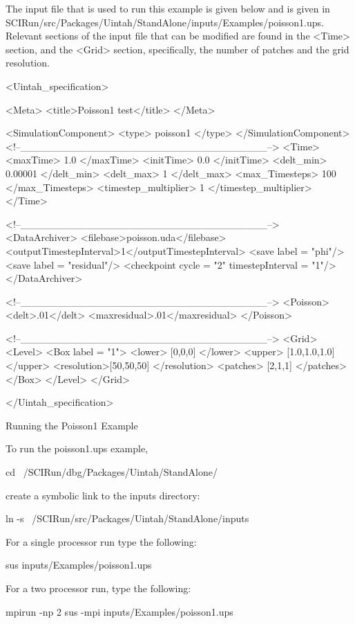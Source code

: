 \documentclass[12pt]{report}
\begin{document}
The input file that is used to run this example is given below and is given in SCIRun/src/Packages/Uintah/StandAlone/inputs/Examples/poisson1.ups.  Relevant sections of the input file that can be modified are found in the <Time> section, and the <Grid> section, specifically, the number of patches and the grid resolution.

<Uintah_specification>

  <Meta>
      <title>Poisson1 test</title>
  </Meta>

  <SimulationComponent>
       <type> poisson1 </type>
  </SimulationComponent>
  <!--__________________________________-->
  <Time>
    <maxTime>       1.0       </maxTime>
    <initTime>      0.0       </initTime>
    <delt_min>      0.00001   </delt_min>
    <delt_max>      1         </delt_max>
    <max_Timesteps> 100        </max_Timesteps>
    <timestep_multiplier>  1  </timestep_multiplier>
  </Time>

  <!--__________________________________-->
  <DataArchiver>
  <filebase>poisson.uda</filebase>
      <outputTimestepInterval>1</outputTimestepInterval>
      <save label = "phi"/>
      <save label = "residual"/>
      <checkpoint cycle = "2" timestepInterval = "1"/>
  </DataArchiver>


  <!--__________________________________-->
  <Poisson>
    <delt>.01</delt>
    <maxresidual>.01</maxresidual>
  </Poisson>


  <!--__________________________________-->
  <Grid>
    <Level>
      <Box label = "1">
         <lower>     [0,0,0]        </lower>
         <upper>     [1.0,1.0,1.0]  </upper>
         <resolution>[50,50,50]     </resolution>
         <patches>   [2,1,1]        </patches>
      </Box>
    </Level>
</Grid>

</Uintah_specification>


Running the Poisson1 Example

To run the poisson1.ups example, 

	cd ~/SCIRun/dbg/Packages/Uintah/StandAlone/

create a symbolic link to the inputs directory:

	ln -s ~/SCIRun/src/Packages/Uintah/StandAlone/inputs

For a single processor run type the following:

	sus inputs/Examples/poisson1.ups

For a two processor run, type the following:

	mpirun -np 2 sus -mpi inputs/Examples/poisson1.ups
\end{document}
